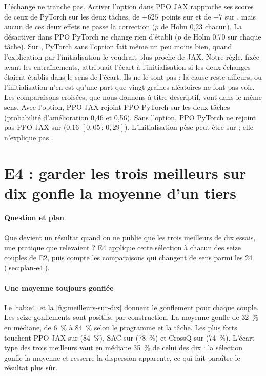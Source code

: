 L'échange ne tranche pas. Activer l'option dans PPO JAX rapproche ses scores de ceux de PyTorch sur les deux
tâches, de $+625$~points sur  et de $-7$ sur , mais aucun de ces deux effets ne
passe la correction ($p$ de Holm 0,23 chacun). La désactiver dans PPO PyTorch ne change rien d'établi ($p$ de
Holm 0,70 sur chaque tâche). Sur , PyTorch sans l'option fait même un peu moins bien, quand
l'explication par l'initialisation le voudrait plus proche de JAX. Notre règle, fixée avant les entraînements,
attribuait l'écart à l'initialisation si les deux échanges étaient établis dans le sens de l'écart. Ils ne le
sont pas : la cause reste ailleurs, ou l'initialisation n'en est qu'une part que vingt graines aléatoires ne
font pas voir. Les comparaisons croisées, que nous donnons à titre descriptif, vont dans le même sens. Avec
l'option, PPO JAX rejoint PPO PyTorch sur les deux tâches (probabilité d'amélioration 0,46 et 0,56). Sans
l'option, PPO PyTorch ne rejoint pas PPO JAX sur  (0,16 $[0{,}05\,;\,0{,}29]$).
L'initialisation pèse peut-être sur  ; elle n'explique pas . 

\section{E4 : garder les trois meilleurs sur dix gonfle la moyenne d'un tiers}\label{sec:e4}

\paragraph{Question et plan}
Que devient un résultat quand on ne publie que les trois meilleurs de dix essais, une pratique que
\textcite{henderson2018matters} relevaient ? E4 applique cette sélection à chacun des seize couples de E2, puis
compte les comparaisons qui changent de sens parmi les 24 (\cref{sec:plan-e4}).

\paragraph{Une moyenne toujours gonflée}
Le \cref{tab:e4} et la \cref{fig:meilleurs-sur-dix} donnent le gonflement pour chaque couple. Les seize
gonflements sont positifs, par construction. La moyenne gonfle de 32~\% en médiane, de 6~\% à 84~\% selon le
programme et la tâche. Les plus forts touchent PPO JAX sur  (84~\%), SAC sur 
(78~\%) et CrossQ sur  (74~\%). L'écart type des trois meilleurs vaut en médiane 35~\% de
celui des dix : la sélection gonfle la moyenne et resserre la dispersion apparente, ce qui fait paraître le
résultat plus sûr.

